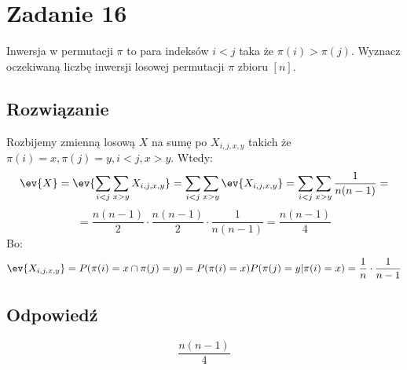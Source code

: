 \section{Zadanie 16}
Inwersja w permutacji \(\pi\) to para indeksów \(i < j\) taka że \(\pi(i) > \pi(j)\).
Wyznacz oczekiwaną liczbę inwersji losowej permutacji \(\pi\) zbioru \([n]\).

\subsection*{Rozwiązanie}
Rozbijemy zmienną losową \(X\) na sumę po \(X_{i, j, x, y}\) takich że \(\pi(i) = x, \pi(j) = y, i < j, x > y\). Wtedy:
\[\ev{X} = \ev{\sum_{i < j}\sum_{x > y}X_{i, j, x, y}} = \sum_{i < j}\sum_{x > y}\ev{X_{i, j, x, y}} = \sum_{i < j}\sum_{x > y}\frac{1}{n(n-1)} =\]
\[= \frac{n(n-1)}{2}\cdot\frac{n(n-1)}{2}\cdot\frac{1}{n(n-1)} = \frac{n(n-1)}{4}\]
Bo:
\[\ev{X_{i, j, x, y}} = P(\pi(i) = x \cap \pi(j) = y) = P(\pi(i) = x)P(\pi(j) = y | \pi(i) = x) = \frac{1}{n}\cdot\frac{1}{n-1}\]
\subsection*{Odpowiedź}
\[
	\boxed{\text{\(\frac{n(n-1)}{4}\)}}
\]
